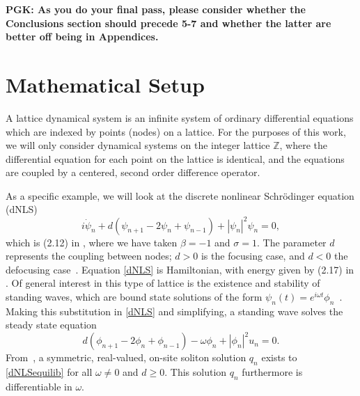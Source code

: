 \documentclass[12pt]{article}
\def\Z{{\mathbb Z}}
\begin{document}
{\bf PGK: As you do your final pass, please consider whether the Conclusions section should precede 5-7 and whether the latter are better off being in Appendices.}

\section{Mathematical Setup}

A lattice dynamical system is an infinite system of ordinary differential equations which are indexed by points (nodes)
on a lattice. For the purposes of this work, we will only consider dynamical systems on the integer lattice $\Z$, where the differential equation for each point on the lattice is identical, and the equations are coupled by a centered, second order difference operator.

As a specific example, we will look at the discrete nonlinear Schr{\"o}dinger equation (dNLS)
\begin{equation}\label{dNLS}
i\dot{\psi}_n + d(\psi_{n+1} - 2 \psi_n + \psi_{n-1}) + |\psi_n|^2 \psi_n = 0,
\end{equation}
which is (2.12) in \cite{Kevrekidis2009}, where we have taken $\beta = -1$ and $\sigma = 1$. The parameter $d$ represents the coupling between nodes; $d > 0$ is the focusing case, and $d < 0$ the defocusing case~\cite{Kevrekidis2009}. Equation \eqref{dNLS} is Hamiltonian, with energy given by (2.17) in \cite{Kevrekidis2009,pelinovsky_2011}. Of general interest in this type of lattice is the existence and stability of standing waves, which are bound state solutions of the form $\psi_n(t) = e^{i \omega t}\phi_n$~\cite{alfimov}. Making this substitution in \eqref{dNLS} and simplifying, a standing wave solves the steady state equation
\begin{equation}\label{dNLSequilib}
d(\phi_{n+1} - 2 \phi_n + \phi_{n-1}) - \omega \phi_n + |\phi_n|^2 u_n = 0.
\end{equation}
From~\cite{herrmann_2011}, a symmetric, real-valued, on-site soliton solution $q_n$ exists to \eqref{dNLSequilib} for all $\omega \neq 0$ and $d \geq 0$. This solution $q_n$ furthermore is differentiable in $\omega$. 
\end{document}
